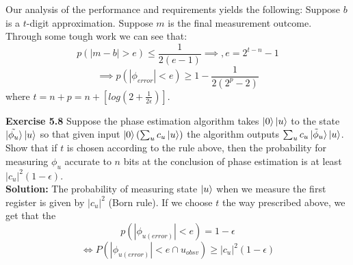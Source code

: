 \documentclass{article}
\begin{document}
Our analysis of the performance and requirements yields the following:
Suppose $b$ is a $t$-digit approximation. Suppose $m$ is the final measurement outcome.
Through some tough work we can see that:
$$p(|m-b| > e) \leq \frac{1}{2(e-1)} \implies, e=2^{t-n} -1$$
$$\implies p(|\phi_{error}| < e) \geq 1 - \frac{1}{2(2^p-2)}$$
where $t=n+p = n + [log (2 + \frac{1}{2\epsilon})]$.
\begin{tcolorbox}\textbf{Exercise 5.8} Suppose the phase estimation algorithm takes $\ket0 \ket{u}$ to the state $\ket{\tilde{\phi_u}}\ket{u}$ so that given input $\ket0 (\sum_u c_u \ket{u})$ the algorithm outputs $\sum_u c_u \ket{\tilde{\phi}_u} \ket{u}$. Show that if $t$ is chosen according to the rule above, then the probability for measuring $\phi_u$ accurate to $n$ bits at the conclusion of phase estimation is at least $|c_u|^2(1-\epsilon)$.\\
	\textbf{Solution:}
	The probability of measuring state $\ket{u}$ when we measure the first register is given by $|c_u|^2$ (Born rule). If we choose $t$ the way prescribed above, we get that the  
	$$ p(|\phi_{u (error)}| < e) = 1 - \epsilon$$
	$$\iff P(|\phi_{u(error)}| < e \cap u_{obsv} ) \geq |c_u|^2 (1-\epsilon)$$
\end{tcolorbox}
\end{document}

